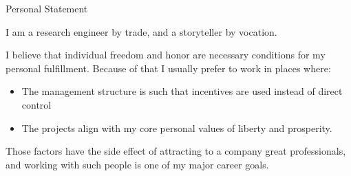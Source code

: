 \begin{rubric}{Personal Statement}{

\prefix{}

\entry*

I am a research engineer by trade, and a storyteller by vocation.

I believe that individual freedom and honor are necessary conditions
for my personal fulfillment. Because of that I usually prefer to work
in places where:

\begin{itemize}
\item The management structure is such that incentives are used
instead of direct control
\item The projects align with my core personal values of liberty and
prosperity.
\end{itemize}

    Those factors have the side effect of attracting to a company
great professionals, and working with such people is one of my major
career goals.

}
\end{rubric}
